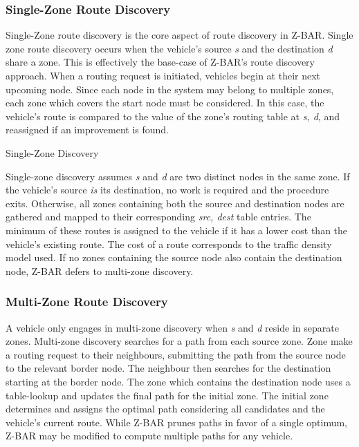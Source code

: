 \documentclass[conference]{IEEEtran}
\begin{document}
\subsubsection{Single-Zone Route Discovery}

Single-Zone route discovery is the core aspect of route discovery in Z-BAR. Single zone route discovery occurs when the vehicle's source \textit{s} and the destination \textit{d} share a zone. This is effectively the base-case of Z-BAR's route discovery approach. When a routing request is initiated, vehicles begin at their next upcoming node. Since each node in the system may belong to multiple zones, each zone which covers the start node must be considered. In this case, the vehicle's route is compared to the value of the zone's routing table at \textit{s, d}, and reassigned if an improvement is found.

\begin{algorithm}[H]
  \caption{Single-Zone Discovery}
  \label{route_discovery_single_zone}
  \begin{algorithmic}[1]
  \EndProcedure
  \end{algorithmic}
\end{algorithm}

Single-zone discovery assumes \textit{s} and \textit{d} are two distinct nodes in the same zone. If the vehicle's source \textit{is} its destination, no work is required and the procedure exits. Otherwise, all zones containing both the source and destination nodes are gathered and mapped to their corresponding \textit{src, dest} table entries. The minimum of these routes is assigned to the vehicle if it has a lower cost than the vehicle's existing route. The cost of a route corresponds to the traffic density model used. If no zones containing the source node also contain the destination node, Z-BAR defers to multi-zone discovery.

\subsubsection{Multi-Zone Route Discovery}

A vehicle only engages in multi-zone discovery when \textit{s} and \textit{d} reside in separate zones. Multi-zone discovery searches for a path from each source zone. Zone make a routing request to their neighbours, submitting the path from the source node to the relevant border node. The neighbour then searches for the destination starting at the border node. The zone which contains the destination node uses a table-lookup and updates the final path for the initial zone. The initial zone determines and assigns the optimal path considering all candidates and the vehicle's current route. While Z-BAR prunes paths in favor of a single optimum, Z-BAR may be modified to compute multiple paths for any vehicle.
\end{document}
